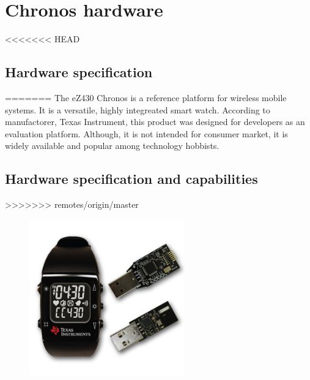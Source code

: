\chapter{Chronos hardware}

<<<<<<< HEAD

\section{Hardware specification}
=======
The eZ430 Chronos is a reference platform for wireless mobile systems.
It is a versatile, highly integreated smart watch.
According to manufactorer, Texas Instrument, this product was designed for developers as an evaluation platform.
Although, it is not intended for consumer market, it is widely available and popular among technology hobbists.

\section{Hardware specification and capabilities}
>>>>>>> remotes/origin/master

\begin{figure}[h!]
  \centering
  \includegraphics[width=0.6\textwidth]{img/chronos_watch.png}
  \caption{}
  \label{fig:eZ430_package}
\end{figure}

